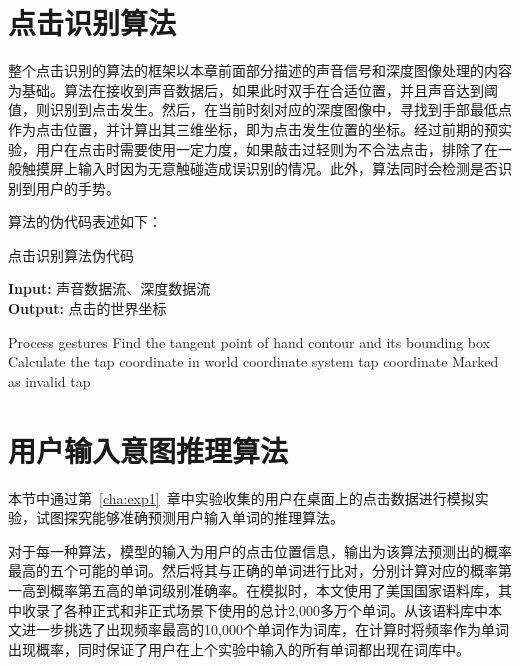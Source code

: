 \section{点击识别算法}
整个点击识别的算法的框架以本章前面部分描述的声音信号和深度图像处理的内容为基础。算法在接收到声音数据后，如果此时双手在合适位置，并且声音达到阈值，则识别到点击发生。然后，在当前时刻对应的深度图像中，寻找到手部最低点作为点击位置，并计算出其三维坐标，即为点击发生位置的坐标。经过前期的预实验，用户在点击时需要使用一定力度，如果敲击过轻则为不合法点击，排除了在一般触摸屏上输入时因为无意触碰造成误识别的情况。此外，算法同时会检测是否识别到用户的手势。

算法的伪代码表述如下：
\begin{algorithm}[h]
  \caption{点击识别算法伪代码} %
  \hspace*{0.02in} {\bf Input:} %
  声音数据流、深度数据流\\
  \hspace*{0.02in} {\bf Output:} %
  点击的世界坐标
  \begin{algorithmic}[1]
        \State Process gestures
      \Else
        \State Find the tangent point of hand contour and its bounding box
        \State Calculate the tap coordinate in world coordinate system
        \State \Return tap coordinate
      \EndIf
    \Else 
      \State Marked as invalid tap 
      \State \Return
    \EndIf
  \EndIf
  \end{algorithmic}
\end{algorithm}

\section{用户输入意图推理算法}
本节中通过第~\ref{cha:exp1}~章中实验收集的用户在桌面上的点击数据进行模拟实验，试图探究能够准确预测用户输入单词的推理算法。

对于每一种算法，模型的输入为用户的点击位置信息，输出为该算法预测出的概率最高的五个可能的单词。然后将其与正确的单词进行比对，分别计算对应的概率第一高到概率第五高的单词级别准确率。在模拟时，本文使用了美国国家语料库\cite{anc}，其中收录了各种正式和非正式场景下使用的总计2,000多万个单词。从该语料库中本文进一步挑选了出现频率最高的10,000个单词作为词库，在计算时将频率作为单词出现概率，同时保证了用户在上个实验中输入的所有单词都出现在词库中。

